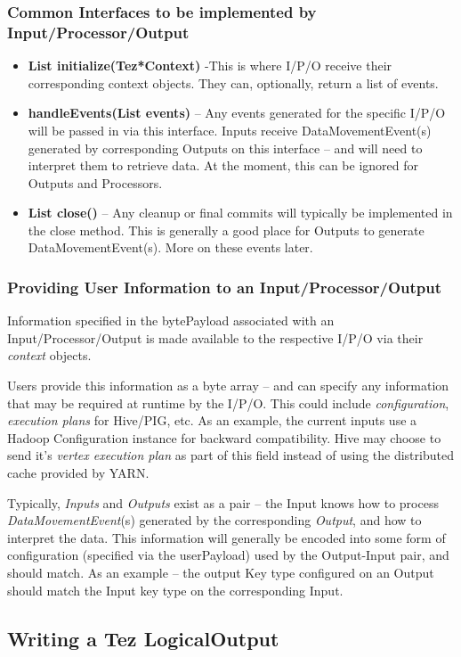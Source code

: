 \documentclass[twocolumn]{article}
\newcommand{\bi}{\begin{itemize}}
\newcommand{\ei}{\end{itemize}}
\newcommand{\ii}{\item}
\begin{document}
\subsubsection*{Common Interfaces to be implemented by
Input/Processor/Output}

\bi
\ii \textbf{List initialize(Tez*Context)} -This is where I/P/O receive their corresponding context objects. They can, optionally, return a list of
events. 
\ii \textbf{handleEvents(List events)} -- Any events generated for the specific I/P/O will be passed in via this interface. Inputs receive DataMovementEvent(s) generated by corresponding Outputs on this interface -- and will need to interpret them to retrieve data. At the moment, this can be ignored for Outputs and Processors. 
\ii \textbf{List close()} --
Any cleanup or final commits will typically be implemented in the close
method. This is generally a good place for Outputs to generate
DataMovementEvent(s). More on these events later.
\ei 
\subsubsection*{Providing User Information to an Input/Processor/Output}
Information specified in the bytePayload associated with an
Input/Processor/Output is made available to the respective I/P/O via
their \textit{context} objects.

Users provide this information as a byte array -- and can specify any
information that may be required at runtime by the I/P/O. This could
include \textit{configuration}, \textit{execution plans} for Hive/PIG, etc. As an example,
the current inputs use a Hadoop Configuration instance for backward
compatibility. Hive may choose to send it's \textit{vertex execution plan} as
part of this field instead of using the distributed cache provided by
YARN.

Typically, \textit{Inputs} and \textit{Outputs} exist as a pair -- the Input knows how to
process \textit{DataMovementEvent}(s) generated by the corresponding \textit{Output}, and
how to interpret the data. This information will generally be encoded
into some form of configuration (specified via the userPayload) used by
the Output-Input pair, and should match. As an example -- the output Key
type configured on an Output should match the Input key type on the
corresponding Input.

\subsection{Writing a Tez LogicalOutput}
\end{document}
